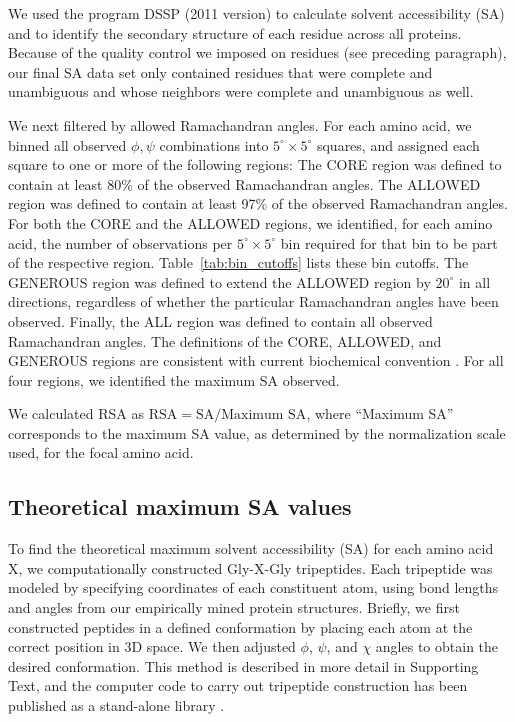 \documentclass[11pt]{article}
\begin{document}
We used the program DSSP (2011 version) \cite{Kabsch1983} to calculate solvent accessibility (SA) and to identify the secondary structure of each residue across all proteins. Because of the quality control we imposed on residues (see preceding paragraph), our final SA data set only contained residues that were complete and unambiguous and whose neighbors were complete and unambiguous as well.

We next filtered by allowed Ramachandran angles. For each amino acid, we binned all observed $\phi, \psi$ combinations into $5^\circ\times5^\circ$ squares, and assigned each square to one or more of the following regions: The CORE region was defined to contain at least 80\% of the observed Ramachandran angles. The ALLOWED region was defined to contain at least 97\% of the observed Ramachandran angles. For both the CORE and the ALLOWED regions, we identified, for each amino acid, the number of observations per $5^\circ\times5^\circ$ bin required for that bin to be part of the respective region. Table~\ref{tab:bin_cutoffs} lists these bin cutoffs. The GENEROUS region was defined to extend the ALLOWED region by $20^\circ$ in all directions, regardless of whether the particular Ramachandran angles have been observed. Finally, the ALL region was defined to contain all observed Ramachandran angles. The definitions of the CORE, ALLOWED, and GENEROUS regions are consistent with current biochemical convention \cite{Morrisetal1992,Laskowskietal1993}. For all four regions, we identified the maximum SA observed.

We calculated RSA as $\text{RSA}=\text{SA}/\text{Maximum SA}$, where ``Maximum SA'' corresponds to the maximum SA value, as determined by the normalization scale used, for the focal amino acid. 



\subsection*{Theoretical maximum SA values}

To find the theoretical maximum solvent accessibility (SA) for each amino acid X, we computationally constructed Gly-X-Gly tripeptides. Each tripeptide was modeled by specifying coordinates of each constituent atom, using bond lengths and angles from our empirically mined protein structures. Briefly, we first constructed peptides in a defined conformation by placing each atom at the correct position in 3D space. We then adjusted $\phi$, $\psi$, and $\chi$ angles to obtain the desired conformation. This method is described in more detail in Supporting Text, and the computer code to carry out tripeptide construction has been published as a stand-alone library \cite{Tienetal2013}. 
\end{document}
